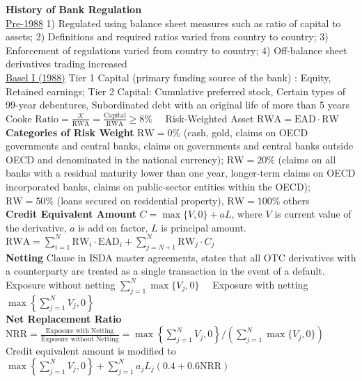 \documentclass[12pt,landscape, a4paper]{article}
\theoremstyle{remark}
\newcommand{\EAD}{\mathrm{EAD}}
\begin{document}
\begin{multicols*}{3}
\textbf{History of Bank Regulation}\\
\underline{Pre-1988} 1) Regulated using balance sheet measures such as ratio of capital to assets; 2) Definitions and required ratios varied from country to country; 3) Enforcement of regulations varied from country to country; 4) Off-balance sheet derivatives trading increased\\

\underline{Basel I (1988)} Tier 1 Capital (primary funding source of the bank) : Equity, Retained earnings; Tier 2 Capital: Cumulative preferred stock, Certain types of 99-year debentures, Subordinated debt with an original life of more than 5 years\\
$\text{Cooke Ratio} = \frac{\mathcal{K}}{\mathrm{RWA}} = \frac{\mathrm{Capital}}{\mathrm{RWA}} \geq 8\% \quad$ Risk-Weighted Asset $\mathrm{RWA} = \mathrm{EAD}\cdot \mathrm{RW}$\\
\textbf{Categories of Risk Weight} $\mathrm{RW}=0\%$ (cash, gold, claims on OECD governments and central banks, claims on governments and central banks outside OECD and denominated in the national currency); $\mathrm{RW}=20\%$ (claims on all banks with a residual maturity lower than one year, longer-term claims on OECD incorporated banks, claims on public-sector entities within the OECD); $\mathrm{RW}=50\%$ (loans secured on residential property), $\mathrm{RW}=100\%$ others\\

\textbf{Credit Equivalent Amount} $C = \max \{V, 0 \} + aL$, where $V$ is current value of the derivative, $a$ is add on factor, $L$ is principal amount.\\

$\mathrm{RWA} = \sum^N_{i=1} \mathrm{RW}_i \cdot \EAD_i + \sum^N_{j=N+1} \mathrm{RW}_j \cdot C_j $ \\

\textbf{Netting} Clause in ISDA master agreements, states that all OTC derivatives with a counterparty are treated as a single transaction in the event of a default.\\
Exposure without netting $\sum^N_{j=1} \max \{V_j, 0 \} \quad$ Exposure with netting $\max \left\{\sum^N_{j=1} V_j, 0  \right\}$\\

\textbf{Net Replacement Ratio} $\mathrm{NRR} =\frac{\text{Exposure with Netting}}{\text{Exposure without Netting}} = \max \left\{\sum^N_{j=1} V_j, 0  \right\} / \left( \sum^N_{j=1} \max \{V_j, 0 \} \right) $\\
Credit equivalent amount is modified to $\max \left\{\sum^N_{j=1} V_j, 0  \right\} + \sum^N_{j=1} a_j L_j (0.4+0.6\mathrm{NRR}) $\\


\end{multicols*}
\end{document}
